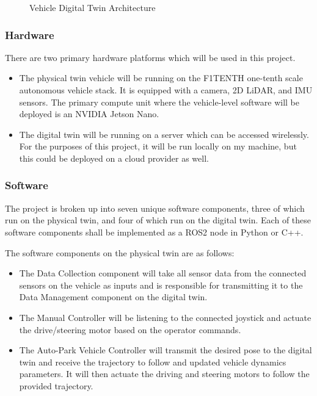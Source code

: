 \FloatBarrier
\begin{figure}[!htbp]
  \centering
  
  \caption{Vehicle Digital Twin Architecture}
  \label{fig:arch}
\end{figure}
\FloatBarrier

\subsubsection{Hardware}

There are two primary hardware platforms which will be used in this project.

\begin{itemize}
    \item The physical twin vehicle will be running on the F1TENTH one-tenth scale autonomous vehicle stack. It is equipped with a camera, 2D LiDAR, and IMU sensors. The primary compute unit where the vehicle-level software will be deployed is an NVIDIA Jetson Nano.
    \item The digital twin will be running on a server which can be accessed wirelessly. For the purposes of this project, it will be run locally on my machine, but this could be deployed on a cloud provider as well. 
\end{itemize}

\subsubsection{Software}

The project is broken up into seven unique software components, three of which run on the physical twin, and four of which run on the digital twin. Each of these software components shall be implemented as a ROS2 node in Python or C++.

The software components on the physical twin are as follows:

\begin{itemize}
    \item The Data Collection component will take all sensor data from the connected sensors on the vehicle as inputs and is responsible for transmitting it to the Data Management component on the digital twin.
    \item The Manual Controller will be listening to the connected joystick and actuate the drive/steering motor based on the operator commands.
    \item The Auto-Park Vehicle Controller will transmit the desired pose to the digital twin and receive the trajectory to follow and updated vehicle dynamics parameters. It will then actuate the driving and steering motors to follow the provided trajectory. 
\end{itemize}

